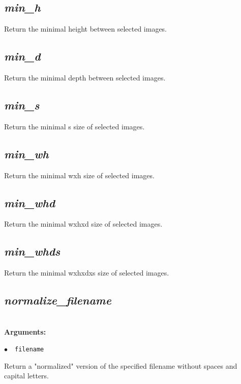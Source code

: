 \documentclass[a4paper,10.5pt,twoside]{book}
\def\comma{\discretionary{,}{}{,}}
\newcommand{\Cb}[1]{\textcolor{cb}{#1}}
\begin{document}
\subsection{\emph{min\_h} }\vspace*{-0.7em}
Return the minimal height between selected images.


\subsection{\emph{min\_d} }\vspace*{-0.7em}
Return the minimal depth between selected images.


\subsection{\emph{min\_s} }\vspace*{-0.7em}
Return the minimal s size of selected images.


\subsection{\emph{min\_wh} }\vspace*{-0.7em}
Return the minimal wxh size of selected images.


\subsection{\emph{min\_whd} }\vspace*{-0.7em}
Return the minimal wxhxd size of selected images.


\subsection{\emph{min\_whds} }\vspace*{-0.7em}
Return the minimal wxhxdxs size of selected images.


\subsection{\emph{normalize\_filename} }\vspace*{-0.7em}
~\\\textbf{\Cb{Arguments: }}\begin{flushleft}
{\small \Cb{\hspace*{0.5cm}$\bullet$~~\texttt{filename}}}\end{flushleft}
Return a "normalized" version of the specified filename{\comma} without spaces and capital letters.
\end{document}
